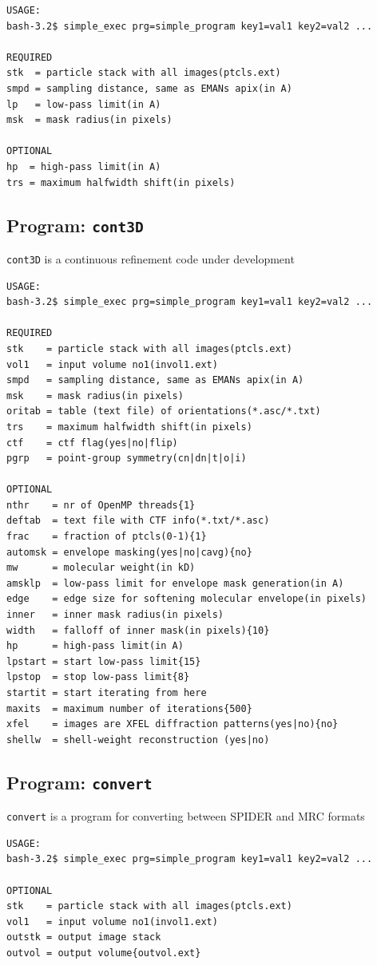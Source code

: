 \documentclass[a4paper,11pt]{article}
\newcommand{\prgname}[1]{\textcolor{NavyBlue}{\texttt{#1}}}
\begin{document}
\begin{verbatim}
USAGE:
bash-3.2$ simple_exec prg=simple_program key1=val1 key2=val2 ...

REQUIRED
stk  = particle stack with all images(ptcls.ext)
smpd = sampling distance, same as EMANs apix(in A)
lp   = low-pass limit(in A)
msk  = mask radius(in pixels)

OPTIONAL
hp  = high-pass limit(in A)
trs = maximum halfwidth shift(in pixels)
\end{verbatim}

\subsection{Program: \prgname{cont3D}}
\label{cont3D}
\prgname{cont3D} is a continuous refinement code under development

\begin{verbatim}
USAGE:
bash-3.2$ simple_exec prg=simple_program key1=val1 key2=val2 ...

REQUIRED
stk    = particle stack with all images(ptcls.ext)
vol1   = input volume no1(invol1.ext)
smpd   = sampling distance, same as EMANs apix(in A)
msk    = mask radius(in pixels)
oritab = table (text file) of orientations(*.asc/*.txt)
trs    = maximum halfwidth shift(in pixels)
ctf    = ctf flag(yes|no|flip)
pgrp   = point-group symmetry(cn|dn|t|o|i)

OPTIONAL
nthr    = nr of OpenMP threads{1}
deftab  = text file with CTF info(*.txt/*.asc)
frac    = fraction of ptcls(0-1){1}
automsk = envelope masking(yes|no|cavg){no}
mw      = molecular weight(in kD)
amsklp  = low-pass limit for envelope mask generation(in A)
edge    = edge size for softening molecular envelope(in pixels)
inner   = inner mask radius(in pixels)
width   = falloff of inner mask(in pixels){10}
hp      = high-pass limit(in A)
lpstart = start low-pass limit{15}
lpstop  = stop low-pass limit{8}
startit = start iterating from here
maxits  = maximum number of iterations{500}
xfel    = images are XFEL diffraction patterns(yes|no){no}
shellw  = shell-weight reconstruction (yes|no)
\end{verbatim}

\subsection{Program: \prgname{convert}}
\label{convert}
\prgname{convert} is a program for converting between SPIDER and MRC formats 

\begin{verbatim}
USAGE:
bash-3.2$ simple_exec prg=simple_program key1=val1 key2=val2 ...

OPTIONAL
stk    = particle stack with all images(ptcls.ext)
vol1   = input volume no1(invol1.ext)
outstk = output image stack
outvol = output volume{outvol.ext}
\end{verbatim}
\end{document}
